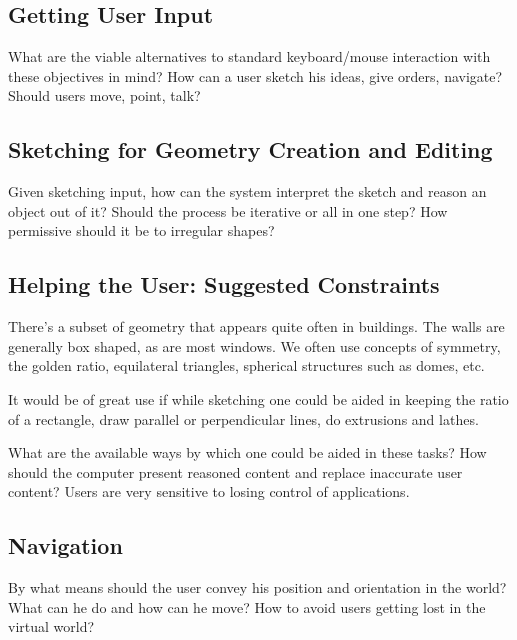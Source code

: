 \subsection{Getting User Input}
What are the viable alternatives to standard keyboard/mouse interaction with these objectives in mind?
How can a user sketch his ideas, give orders, navigate? Should users move, point, talk?


\subsection{Sketching for Geometry Creation and Editing}
Given sketching input, how can the system interpret the sketch and reason an object out of it?
Should the process be iterative or all in one step?
How permissive should it be to irregular shapes?
 

\subsection{Helping the User: Suggested Constraints}
There's a subset of geometry that appears quite often in buildings.
The walls are generally box shaped, as are most windows. We often use concepts of symmetry,
the golden ratio, equilateral triangles, spherical structures such as domes, etc.

It would be of great use if while sketching one could be aided in keeping the ratio of
a rectangle, draw parallel or perpendicular lines, do extrusions and lathes.

What are the available ways by which one could be aided in these tasks?
How should the computer present reasoned content and replace inaccurate user content?
Users are very sensitive to losing control of applications.


\subsection{Navigation}
By what means should the user convey his position and orientation in the world?
What can he do and how can he move?
How to avoid users getting lost in the virtual world?
